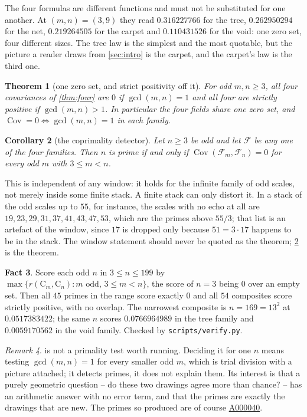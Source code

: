 \documentclass[11pt]{amsart}
\newtheorem{theorem}{Theorem}[section]
\newtheorem{corollary}[theorem]{Corollary}
\theoremstyle{definition}
\newtheorem{fact}[theorem]{Fact}
\theoremstyle{remark}
\newtheorem{remark}[theorem]{Remark}
\begin{document}
The four formulas are different functions and must not be substituted for one another. At $(m,n)=(3,9)$ they read $0.316227766$ for the tree, $0.262950294$ for the net, $0.219264505$ for the carpet and $0.110431526$ for the void: one zero set, four different sizes. The tree law is the simplest and the most quotable, but the picture a reader draws from \cref{sec:intro} is the carpet, and the carpet's law is the third one.

\begin{theorem}[one zero set, and strict positivity off it]
\label{thm:zeroset}
For odd $m,n\ge3$, all four covariances of \cref{thm:four} are $0$ if $\gcd(m,n)=1$ and all four are strictly positive if $\gcd(m,n)>1$. In particular the four fields share one zero set, and $\operatorname{Cov}=0\iff\gcd(m,n)=1$ in each family.
\end{theorem}

\begin{corollary}[the coprimality detector]
\label{cor:detector}
Let $n\ge3$ be odd and let $\mathcal F$ be any one of the four families. Then $n$ is prime if and only if $\operatorname{Cov}(\mathcal F_m,\mathcal F_n)=0$ for every odd $m$ with $3\le m<n$.
\end{corollary}

This is independent of any window: it holds for the infinite family of odd scales, not merely inside some finite stack. A finite stack can only distort it. In a stack of the odd scales up to $55$, for instance, the scales with no echo at all are $19,23,29,31,37,41,43,47,53$, which are the primes above $55/3$; that list is an artefact of the window, since $17$ is dropped only because $51=3\cdot17$ happens to be in the stack. The window statement should never be quoted as the theorem; \cref{cor:detector} is the theorem.

\begin{fact}
\label{fact:separation}
Score each odd $n$ in $3\le n\le199$ by $\max\{r(\mathrm{C}_m,\mathrm{C}_n):m\text{ odd},\,3\le m<n\}$, the score of $n=3$ being $0$ over an empty set. Then all $45$ primes in the range score exactly $0$ and all $54$ composites score strictly positive, with no overlap. The narrowest composite is $n=169=13^2$ at $0.0517383422$; the same $n$ scores $0.0766964989$ in the tree family and $0.0059170562$ in the void family. Checked by \texttt{scripts/verify.py}.
\end{fact}

\begin{remark}
\label{rem:trial}
 is not a primality test worth running. Deciding it for one $n$ means testing $\gcd(m,n)=1$ for every smaller odd $m$, which is trial division with a picture attached; it detects primes, it does not explain them. Its interest is that a purely geometric question -- do these two drawings agree more than chance? -- has an arithmetic answer with no error term, and that the primes are exactly the drawings that are new. The primes so produced are of course \href{https://oeis.org/A000040}{A000040}.
\end{remark}
\end{document}
